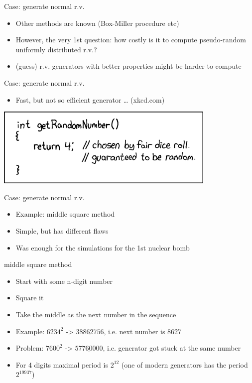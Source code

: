 \documentclass[presentation]{beamer}
\begin{document}
\begin{frame}[label=sec-3-4]{Case: generate normal r.v.}
\begin{itemize}
\item Other methods are known (Box-Miller procedure etc)
\item However, the very 1st question: how costly is it to compute pseudo-random uniformly distributed r.v.?
\item (guess) r.v. generators with better properties might be harder to compute
\end{itemize}
\end{frame}
\begin{frame}[label=sec-3-5]{Case: generate normal r.v.}
\begin{itemize}
\item Fast, but not so efficient generator \ldots{} (xkcd.com)
\end{itemize}
\includegraphics[width=.9\linewidth]{./img/xkcd_random.png}
\end{frame}
\begin{frame}[label=sec-3-6]{Case: generate normal r.v.}
\begin{itemize}
\item Example: middle square method
\item Simple, but has different flaws
\item Was enough for the simulations for the 1st nuclear bomb
\end{itemize}
\begin{block}{middle square method}
\begin{itemize}
\item Start with some n-digit number
\item Square it
\item Take the middle as the next number in the sequence
\item Example: $6234^2$ -> $38\underline{8627}56$, i.e. next number is 8627
\item Problem: $7600^2$ -> $57\underline{7600}00$, i.e. generator got stuck at the same number
\item For 4 digits maximal period is $2^{12}$ (one of modern generators has the period $2^{19937}$)
\end{itemize}
\end{block}
\end{frame}
\end{document}
